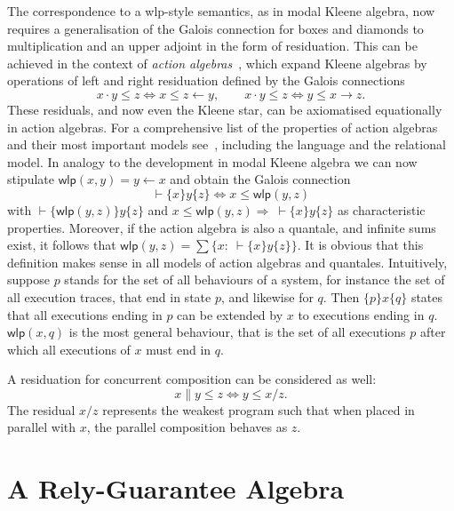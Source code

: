\documentclass{llncs}
\newcommand{\wlp}{\mathsf{wlp}}
\begin{document}
The correspondence to a wlp-style semantics, as in modal Kleene
algebra, now requires a generalisation of the Galois connection for
boxes and diamonds to multiplication and an upper adjoint in the form
of residuation.  This can be achieved in the context of \emph{action
  algebras}~\cite{pratt_action_1990}, which expand Kleene algebras by operations
of left and right residuation defined by the Galois connections
\begin{equation*}
  x\cdot y\le z\Leftrightarrow x\le z\leftarrow y,\qquad x\cdot y\le z \Leftrightarrow y\le x\rightarrow z.
\end{equation*}
These residuals, and now even the Kleene star, can be axiomatised
equationally in action algebras. For a comprehensive list of the
properties of action algebras and their most important models
see~\cite{armstrong_kleene_2013}, including the language and the relational
model. In analogy to the development in modal Kleene algebra we can
now stipulate $ \wlp(x,y)=y\leftarrow x$ and obtain the Galois
connection
\begin{equation*}
  \vdash \{x\}y\{z\} \Leftrightarrow x\le \wlp(y,z)
\end{equation*}
with $\vdash \{\wlp(y,z)\}y\{z\}$ and $x\le \wlp(y,z)\Rightarrow \
\vdash \{x\}y\{z\}$ as characteristic properties. Moreover, if the
action algebra is also a quantale, and infinite sums exist, it follows
that $ \wlp(y,z)=\sum\{x:\ \vdash \{x\}y\{z\}\}$.  It is obvious that
this definition makes sense in all models of action algebras and
quantales. Intuitively, suppose $p$ stands for the set of all
behaviours of a system, for instance the set of all execution traces,
that end in state $p$, and likewise for $q$. Then $\{p\}x\{q\}$ states
that all executions ending in $p$ can be extended by $x$ to executions
ending in $q$. $\wlp(x,q)$ is the most general behaviour, that is the
set of all executions $p$ after which all executions of $x$ must end
in $q$.

A residuation for concurrent composition can be considered as well:
\begin{equation*}
x\|y \le z \Leftrightarrow y \le x/z.
\end{equation*}
The residual $x/z$ represents the weakest program such that when
placed in parallel with $x$, the parallel composition behaves as $z$.


\section{A  Rely-Guarantee Algebra}
\label{sec:RG}
\end{document}
